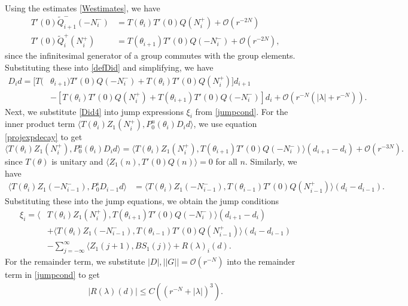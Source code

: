 \documentclass[12pt]{elsarticle}
\begin{document}
Using the estimates \cref{Westimates}, we have
\begin{align*}
T'(0) \tilde{Q}_{i+1}^-(-N_i^-) &= T(\theta_i) T'(0) Q(N_i^+) + \mathcal{O}(r^{-2N}) \\
T'(0) \tilde{Q}_i^+(N_i^+) &= T(\theta_{i+1}) T'(0) Q(-N_i^-) + \mathcal{O}(r^{-2N}),
\end{align*}
since the infinitesimal generator of a group commutes with the group elements. Substituting these into \cref{defDid} and simplifying, we have
\begin{equation}\label{Did4}
\begin{aligned}
D_i d = [ T(&\theta_{i+1}) T'(0)Q(-N_i^-) + T(\theta_i) T'(0)Q(N_i^+) ] d_{i+1} \\
&- [ T(\theta_i) T'(0)Q(N_i^+) + T(\theta_{i+1}) T'(0)Q(-N_i^-) ] d_i 
+\mathcal{O}(r^{-N}( |\lambda| + r^{-N})).
\end{aligned}
\end{equation}
Next, we substitute \cref{Did4} into jump expressions $\xi_i$ from \cref{jumpcond}. For the inner product term $\langle T(\theta_i) Z_1(N_i^+), P_0^u(\theta_i) D_i d \rangle$, we use equation \cref{projexpdecay} to get
\begin{equation*}
\langle T(\theta_i) Z_1(N_i^+), P_0^u(\theta_i) D_i d \rangle 
= \langle T(\theta_i) Z_1(N_i^+), T(\theta_{i+1}) T'(0)Q(-N_i^-) \rangle (d_{i+1} - d_i)
+ \mathcal{O}(r^{-3N}).
\end{equation*}
since $T(\theta)$ is unitary and $\langle Z_1(n), T'(0)Q(n) \rangle = 0$ for all $n$. Similarly, we have
\begin{align*}
\langle T(\theta_i) Z_1(-N_{i-1}^-), P_0^s D_{i-1} d \rangle 
&= \langle T(\theta_i) Z_1(-N_{i-1}^-), T(\theta_{i-1}) T'(0)Q(N_{i-1}^+) \rangle (d_i - d_{i-1}).
\end{align*}
Substituting these into the jump equations, we obtain the jump conditions
\begin{align*}
\xi_i = \langle &T(\theta_i) Z_1(N_i^+), T(\theta_{i+1}) T'(0)Q(-N_i^-) \rangle (d_{i+1} - d_i) \\
&+ \langle T(\theta_i) Z_1(-N_{i-1}^-), T(\theta_{i-1}) T'(0)Q(N_{i-1}^+) \rangle (d_i - d_{i-1}) \\
&- \sum_{j = -\infty}^{\infty} \langle Z_1(j+1), B S_1(j)\rangle + R(\lambda)_i(d).
\end{align*}
For the remainder term, we substitute $|D|, ||G|| = \mathcal{O}(r^{-N})$ into the remainder term in \cref{jumpcond} to get
\begin{align*}
|R(\lambda)(d)| \leq C\left( (r^{-N} + |\lambda|)^3 \right).
\end{align*} 
\end{document}
